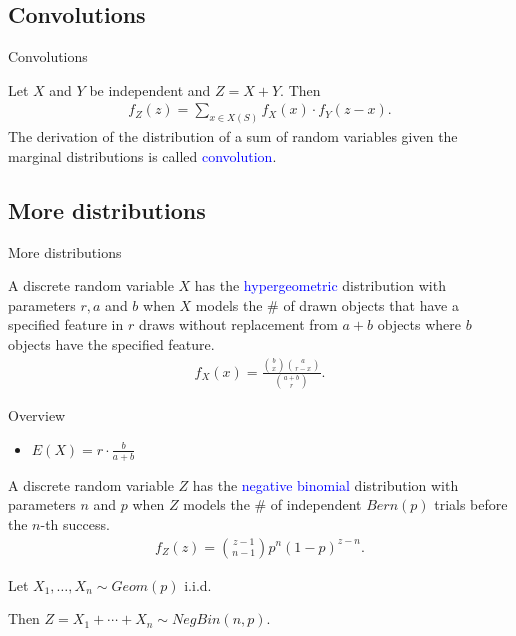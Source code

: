 \documentclass{beamer}
\def\b{\textcolor{blue}}
\begin{document}
\subsection{Convolutions}
\begin{frame}{Convolutions}
    \begin{definition}
        Let $X$ and $Y$ be independent and $Z = X + Y$. Then
        \begin{align*}
            f_Z(z) = \sum_{x \in X(S)} f_X(x) \cdot f_Y(z - x).
        \end{align*}\pause
        The derivation of the distribution of a sum of random variables given the marginal distributions is called \b{convolution}.
    \end{definition}
\end{frame}

\subsection{More distributions}
\begin{frame}{More distributions}
    \begin{definition}
        A discrete random variable $X$ has the \b{hypergeometric} distribution with parameters $r, a$ and $b$ when $X$ models the \# of drawn objects that have a specified feature in $r$ draws without replacement from $a + b$ objects where $b$ objects have the specified feature.\pause
        \begin{align*}
            f_X(x) = \frac{{b \choose x}{a \choose r - x}}{{a + b \choose r}}.
        \end{align*}\pause
        \begin{exampleblock}{Overview}
            \begin{itemize}
                \item $E(X) = r \cdot \frac{b}{a + b}$
            \end{itemize}
        \end{exampleblock}
    \end{definition}
\end{frame}

\begin{frame}
    \begin{definition}
        A discrete random variable $Z$ has the \b{negative binomial} distribution with parameters $n$ and $p$ when $Z$ models the \# of independent $Bern(p)$ trials before the $n$-th success.\pause
        \begin{align*}
            f_Z(z) = {z - 1 \choose n - 1} p^n (1 - p)^{z - n}.
        \end{align*}\pause
        \begin{example}
            Let $X_1, \dots, X_n \sim Geom(p)$ i.i.d.\par
            Then $Z = X_1 + \cdots + X_n \sim NegBin(n,p)$.
        \end{example}
    \end{definition}
\end{frame}
\end{document}
